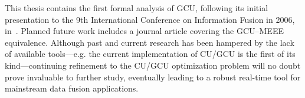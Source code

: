 This thesis contains the first formal analysis of GCU, following its initial presentation to the 9th International
Conference on Information Fusion in 2006, in~\cite{fusion06}. Planned future work includes a journal article covering
the GCU--MEEE equivalence. Although past and current research has been hampered by the lack of available tools---e.g. the
current implementation of CU/GCU is the first of its kind---continuing refinement to the CU/GCU optimization problem
will no doubt prove invaluable to further study, eventually leading to a robust real-time tool for mainstream data fusion
applications.


